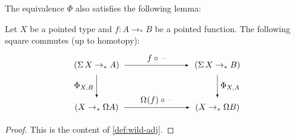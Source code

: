 \documentclass[english,a4]{article}
\renewcommand{\ap}[1]{\left[{#1}\right]}
\newcommand{\ptdto}{\to_\ast}%
\begin{document}
The equivalence $\Phi$ also satisfies the following lemma:
\begin{lemma} \label{lem:ap-Sigma}
    Let $X$ be a pointed type and $f : A \ptdto B$ be a pointed function.
    The following square commutes (up to homotopy):
    \begin{equation}
    \begin{tikzpicture}[x=5cm,y=-1.75cm,baseline=(current bounding box.center)]
    \tikzset{arrow/.style={shorten >=0.1cm,shorten <=.1cm,-latex}}
    \node (A) at (0,0) {$(\susp X \to_* A)$}; 
    \node (D) at (1,0) {$(\susp X \to_* B)$}; 
    \node (B) at (0,1) {$(X \to_* \Omega A)$}; 
    \node (C) at (1,1) {$(X \to_* \Omega B)$}; 
    
    \draw[arrow] (A) to node [above] {$f \circ \blank$} (D);
    \draw[arrow] (A) to node [left] {$\Phi_{X,B}$} (B);
    \draw[arrow] (B) to node [above] {$\loopspace\null (f) \circ \blank$} (C);
    \draw[arrow] (D) to node [right] {$\Phi_{X,A}$} (C);
    \end{tikzpicture}
    \end{equation}
\end{lemma}
\begin{proof}
    This is the content of \cref{def:wild-adj}.
\end{proof}
\end{document}
